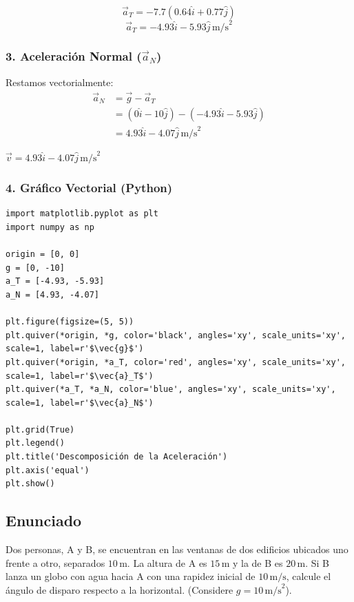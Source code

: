 \documentclass[12pt, a4paper]{article}
\begin{document}
$$ \vec{a}_T = -7.7(0.64\hat{i} + 0.77\hat{j})$$
$$ \vec{a}_T = {-4.93\hat{i} - 5.93\hat{j} \, \text{m/s}^2} $$

\subsubsection*{3. Aceleración Normal ($\vec{a}_N$)}
Restamos vectorialmente:
\begin{align*}
    \vec{a}_N &= \vec{g} - \vec{a}_T \\
    &= (0\hat{i} - 10\hat{j}) - (-4.93\hat{i} - 5.93\hat{j}) \\
    &= {4.93\hat{i} - 4.07\hat{j} \, \text{m/s}^2}
\end{align*}

\begin{tcolorbox}[colback=blue!5!white, colframe=blue!75!black, title=Respuesta Final]
\centering
$\vec{v} = 4.93\hat{i} - 4.07\hat{j} \, \text{m/s}^2$
\end{tcolorbox}

\subsubsection*{4. Gráfico Vectorial (Python)}
\begin{verbatim}
import matplotlib.pyplot as plt
import numpy as np

origin = [0, 0]
g = [0, -10]
a_T = [-4.93, -5.93]
a_N = [4.93, -4.07]

plt.figure(figsize=(5, 5))
plt.quiver(*origin, *g, color='black', angles='xy', scale_units='xy', scale=1, label=r'$\vec{g}$')
plt.quiver(*origin, *a_T, color='red', angles='xy', scale_units='xy', scale=1, label=r'$\vec{a}_T$')
plt.quiver(*a_T, *a_N, color='blue', angles='xy', scale_units='xy', scale=1, label=r'$\vec{a}_N$')

plt.grid(True)
plt.legend()
plt.title('Descomposición de la Aceleración')
plt.axis('equal')
plt.show()
\end{verbatim}

\newpage

\subsection*{Enunciado}
Dos personas, A y B, se encuentran en las ventanas de dos edificios ubicados uno frente a otro, separados $10\,\text{m}$. La altura de A es $15\,\text{m}$ y la de B es $20\,\text{m}$. Si B lanza un globo con agua hacia A con una rapidez inicial de $10\,\text{m/s}$, calcule el ángulo de disparo respecto a la horizontal. (Considere $g=10\,\text{m/s}^2$).
\end{document}
